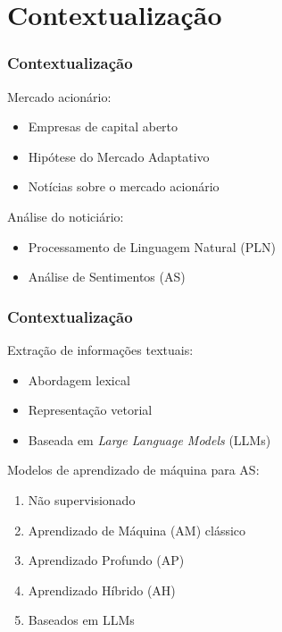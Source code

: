 \section{Contextualização} %


\begin{frame}
	\frametitle{Contextualização}
     
     Mercado acionário:
    \begin{itemize}
        \item Empresas de capital aberto
        \item Hipótese do Mercado Adaptativo
        \item Notícias sobre o mercado acionário
    \end{itemize}
    \bigskip
    Análise do noticiário:
    \begin{itemize}
        \item Processamento de Linguagem Natural (PLN)
        \item Análise de Sentimentos (AS)
    \end{itemize}
	
\end{frame}



\begin{frame}
	\frametitle{Contextualização}
     
    Extração de informações textuais:
    \begin{itemize}
        \item Abordagem lexical
        \item Representação vetorial
        \item Baseada em \textit{Large Language Models} (LLMs)
    \end{itemize}
    \bigskip
    Modelos de aprendizado de máquina para AS:
    \begin{enumerate}
        \item Não supervisionado
        \item Aprendizado de Máquina (AM) clássico
        \item Aprendizado Profundo (AP)
        \item Aprendizado Híbrido (AH)
        \item Baseados em LLMs
    \end{enumerate}
	
\end{frame}

